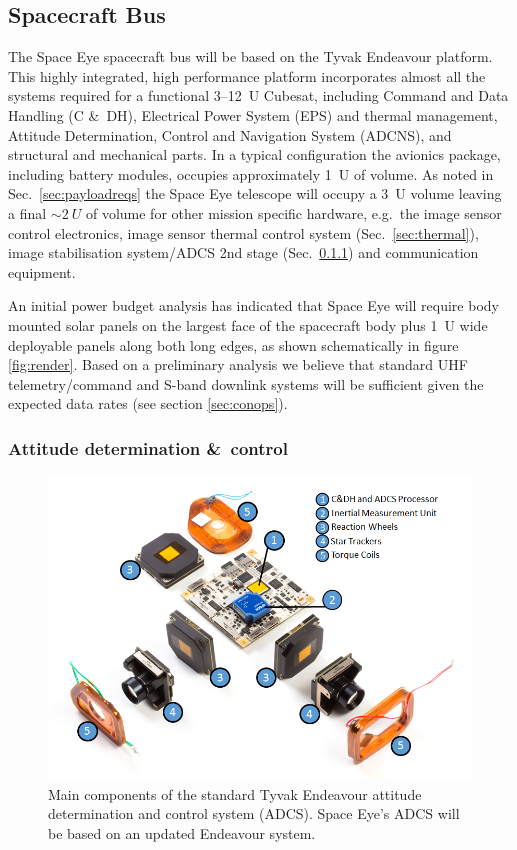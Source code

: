 \documentclass[]{iac}
\begin{document}
\subsection{Spacecraft Bus}

The Space Eye spacecraft bus will be based on the Tyvak Endeavour platform. This highly integrated, high performance
platform incorporates almost all the systems required for a functional 3--\SI{12}{U} Cubesat, including Command and Data
Handling (C \&\ DH),  Electrical Power System (EPS) and thermal management, Attitude Determination, Control and
Navigation System (ADCNS), and structural and mechanical parts.  In a typical configuration the avionics package,
including battery modules, occupies approximately \SI{1}{U} of volume.  As noted in Sec.~\ref{sec:payloadreqs} the Space
Eye telescope will occupy a \SI{3}{U} volume leaving a final $\sim\SI{2}{U}$ of volume for other mission specific
hardware, e.g.\ the image sensor control electronics, image sensor thermal control system (Sec.~\ref{sec:thermal}),
image stabilisation system/ADCS 2nd stage (Sec.~\ref{sec:adcs}) and communication equipment.

An initial power budget analysis has indicated that Space Eye will require body mounted solar panels on the largest face
of the spacecraft body plus \SI{1}{U} wide deployable panels along both long edges, as shown schematically in figure
\ref{fig:render}. Based on a preliminary analysis we believe that standard UHF telemetry/command and S-band downlink
systems will be sufficient given the expected data rates (see section \ref{sec:conops})\cite{Reisenfeld2015}.

\subsubsection{Attitude determination \&\ control}
\label{sec:adcs}

\begin{figure}[htp]
  \center \includegraphics[width=\columnwidth]{figures/adcs.png}
  \caption{\label{fig:adcs}Main components of the standard Tyvak Endeavour attitude determination and control system
    (ADCS). Space Eye's ADCS will be based on an updated Endeavour system.}
\end{figure}
\end{document}
